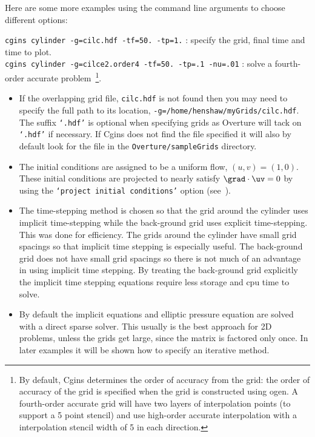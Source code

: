 \documentclass{article}
\begin{document}
Here are some more examples using the command line arguments to choose different options:
\begin{flushleft}
  {\tt cgins cylinder -g=cilc.hdf -tf=50. -tp=1.} : specify the grid, final time and time to plot. \\
  {\tt cgins cylinder -g=cilce2.order4 -tf=50. -tp=.1 -nu=.01} : solve a fourth-order accurate 
         problem~\footnote{By default, Cgins determines the order of accuracy from the grid: the order of accuracy
         of the grid is specified when the grid is constructed using ogen. A fourth-order accurate grid will have two
     layers of interpolation points (to support a 5 point stencil) and use high-order accurate interpolation with a
     interpolation stencil width of 5 in each direction.}. 
\end{flushleft}



\begin{itemize}
  \item If the overlapping grid file, {\tt cilc.hdf} is not found then you may need to specify
        the full path to its location, {\tt -g=/home/henshaw/myGrids/cilc.hdf}. The suffix {\tt `.hdf'}
        is optional when specifying grids as Overture will tack on {\tt `.hdf'} if necessary.
        If Cgins does not  find the file specified it will also by default look for the file in the
        {\tt Overture/\-sampleGrids} directory. 
  \item The initial conditions are assigned to be a uniform flow, $(u,v)=(1,0)$. 
        These initial conditions are projected to nearly satisfy $\grad\cdot\uv=0$
        by using the {\tt `project initial conditions'} option (see~\cite{CginsReferenceManual}).
  \item The time-stepping method is chosen so that the grid around the cylinder
         uses implicit time-stepping while the back-ground grid uses explicit time-stepping.
        This was done for efficiency. The grids around the cylinder have small grid spacings so that
        implicit time stepping is especially useful. The back-ground grid does not have small grid spacings
        so there is not much of an advantage in using implicit time stepping.
        By treating the back-ground grid explicitly the implicit time stepping equations 
        require less storage and cpu time to solve.
  \item By default the implicit equations and elliptic pressure equation are solved with a direct sparse solver. This usually
        is the best approach for 2D problems, unless the grids get large, since the matrix is factored
        only once. In later examples it will be shown how to specify an iterative method.
\end{itemize}
\end{document}
